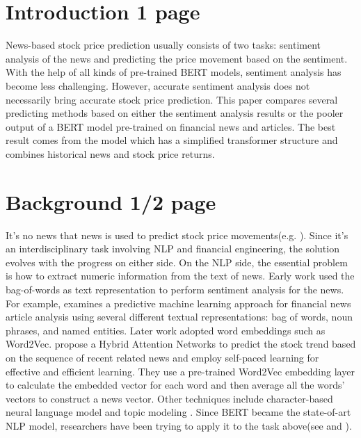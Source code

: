 \documentclass[11pt]{article}
\begin{document}
\section{Introduction 1 page}

News-based stock price prediction usually consists of two tasks: sentiment analysis of the news and predicting the price movement based on the sentiment. With the help of all kinds of pre-trained BERT models, sentiment analysis has become less challenging. However, accurate sentiment analysis does not necessarily bring accurate stock price prediction. This paper compares several predicting methods based on either the sentiment analysis results or the pooler output of a BERT model pre-trained on financial news and articles. The best result comes from the model which has a simplified transformer structure and combines historical news and stock price returns. 

\section{Background 1/2 page}

It's no news that news is used to predict stock price movements(e.g. \citealp{Tetlock:2007}). Since it's an interdisciplinary task involving NLP and financial engineering, the solution evolves with the progress on either side. On the NLP side, the essential problem is how to extract numeric information from the text of news. Early work used the bag-of-words as text representation to perform sentiment analysis for the news. For example, \citet{Schumaker:2009} examines a predictive machine learning approach for financial news article analysis using several different textual representations: bag of words, noun phrases, and named entities. Later work adopted word embeddings such as Word2Vec.\citet{Hu:2018} propose a Hybrid Attention Networks to predict the stock trend based on the sequence of recent related news and employ self-paced learning for effective and efficient learning. They use a pre-trained Word2Vec embedding layer to calculate the embedded vector for each word and then average all the words' vectors to construct a news vector. Other techniques include character-based neural language model \citep{dos-santos-pinheiro-dras-2017-stock} and topic modeling \citep{nguyen-shirai-2015-topic}. Since BERT became the state-of-art NLP model, researchers have been trying to apply it to the task above(see \citet{sawhney-etal-2021-quantitative} and \citet{tsutsumi-utsuro-2022-detecting}). 
\end{document}
